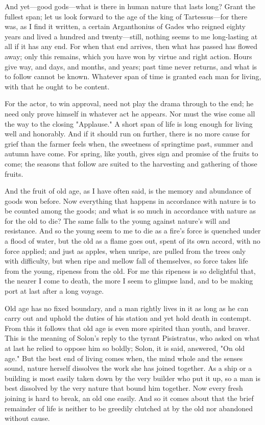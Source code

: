  And yet—good gods—what is there in human nature that lasts long? Grant the fullest span; let us look forward to the age of the king of Tartessus—for there was, as I find it written, a certain Arganthonius of Gades who reigned eighty years and lived a hundred and twenty—still, nothing seems to me long-lasting at all if it has any end. For when that end arrives, then what has passed has flowed away; only this remains, which you have won by virtue and right action. Hours give way, and days, and months, and years; past time never returns, and what is to follow cannot be known. Whatever span of time is granted each man for living, with that he ought to be content.

 For the actor, to win approval, need not play the drama through to the end; he need only prove himself in whatever act he appears. Nor must the wise come all the way to the closing "Applause." A short span of life is long enough for living well and honorably. And if it should run on further, there is no more cause for grief than the farmer feels when, the sweetness of springtime past, summer and autumn have come. For spring, like youth, gives sign and promise of the fruits to come; the seasons that follow are suited to the harvesting and gathering of those fruits.

 And the fruit of old age, as I have often said, is the memory and abundance of goods won before. Now everything that happens in accordance with nature is to be counted among the goods; and what is so much in accordance with nature as for the old to die? The same falls to the young against nature's will and resistance. And so the young seem to me to die as a fire's force is quenched under a flood of water, but the old as a flame goes out, spent of its own accord, with no force applied; and just as apples, when unripe, are pulled from the trees only with difficulty, but when ripe and mellow fall of themselves, so force takes life from the young, ripeness from the old. For me this ripeness is so delightful that, the nearer I come to death, the more I seem to glimpse land, and to be making port at last after a long voyage.

 Old age has no fixed boundary, and a man rightly lives in it as long as he can carry out and uphold the duties of his station and yet hold death in contempt. From this it follows that old age is even more spirited than youth, and braver. This is the meaning of Solon's reply to the tyrant Pisistratus, who asked on what at last he relied to oppose him so boldly; Solon, it is said, answered, "On old age." But the best end of living comes when, the mind whole and the senses sound, nature herself dissolves the work she has joined together. As a ship or a building is most easily taken down by the very builder who put it up, so a man is best dissolved by the very nature that bound him together. Now every fresh joining is hard to break, an old one easily. And so it comes about that the brief remainder of life is neither to be greedily clutched at by the old nor abandoned without cause.

